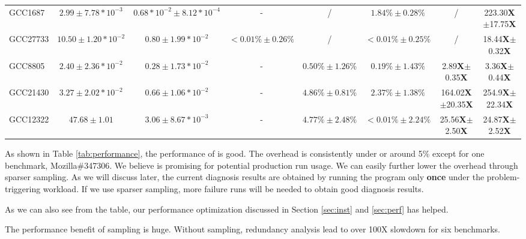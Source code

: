 \begin{table*}[tb!]
\begin{tabular}{lccccccc}
      GCC1687     & $2.99\pm7.78*10^{-3}$ & $0.68*10^{-2}\pm8.12*10^{-4}$          & -              & /                 &  $1.84\%\pm0.28\%$                &   /                           & 223.30{\bf X}$\pm$17.75{\bf X} \\
      GCC27733    &  $10.50\pm1.20*10^{-2}$ & $0.80\pm1.99*10^{-2}$           & $<0.01\%\pm0.26\%$   & /           &  $<0.01\%\pm0.25\%$               &   /                           & 18.44{\bf X}$\pm$0.32{\bf X}     \\
      GCC8805     & $2.40\pm2.36*10^{-2}$  & $0.28\pm1.73*10^{-2}$          & -              & $0.50\%\pm1.26\%$ &  $0.19\%\pm1.43\%$                & 2.89{\bf X}$\pm$0.35{\bf X}    & 3.36{\bf X}$\pm$0.44{\bf X}\\
      GCC21430    & $3.27\pm2.02*10^{-2}$             & $0.66\pm1.06*10^{-2}$          & -              & $4.86\%\pm0.81\%$ &  $2.37\%\pm1.38\%$                & 164.02{\bf X}$\pm$20.35{\bf X} & 254.9{\bf X}$\pm$22.34{\bf X} \\
      GCC12322    & $47.68\pm1.01$       & $3.06\pm8.67*10^{-3}$          & -              & $4.77\%\pm2.48\%$ &  $<0.01\%\pm2.24\%$               & 25.56{\bf X}$\pm$2.50{\bf X}  & 24.87{\bf X}$\pm$2.52{\bf X} \\
   \bottomrule
   \end{tabular}
  \caption{Run-time overhead of applying \Tool to the buggy loop
    (only non-extracted benchmarks are shown). 
  -: dynamic analysis is not needed;
  /: not applicable;
  execution time is measured in seconds;
  $95\%$ confidence interval is calculated by running each benchmark 10 times.}
  \label{tab:performance}
\end{table*}


As shown in Table \ref{tab:performance}, 
the performance of \Tool is good. The overhead is consistently under or around 5\% 
except for one benchmark, Mozilla\#347306. We believe \Tool is promising for potential production
run usage.
We can easily further lower the overhead through sparser sampling.
As we will discuss later, 
the current diagnosis results are obtained by running the
program only \textbf{once} under the problem-triggering workload.
If we use sparser sampling, more failure runs will be needed to obtain good
diagnosis results.

As we can also see from the table, our performance optimization discussed in 
Section \ref{sec:inst} and \ref{sec:perf} has helped.

The performance benefit of sampling is huge.
Without sampling, redundancy
analysis lead to over 100X slowdown for six benchmarks.

